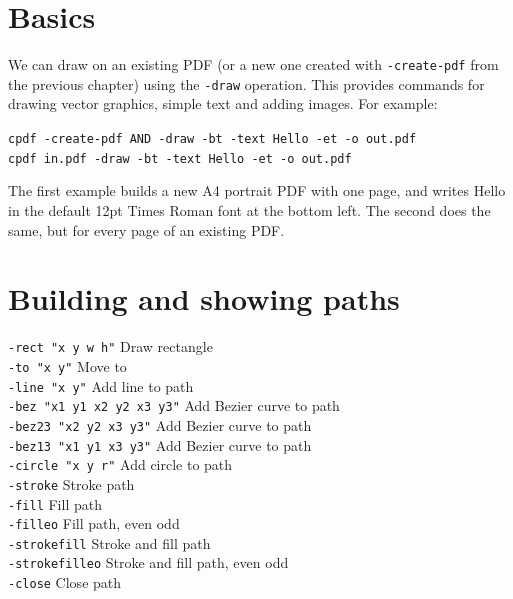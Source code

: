 \documentclass{book}
\begin{document}
\section{Basics}

We can draw on an existing PDF (or a new one created with \texttt{-create-pdf} from the previous chapter) using the \texttt{-draw} operation. This provides commands for drawing vector graphics, simple text and adding images. For example:

\begin{framed}
 \noindent\small\verb?cpdf -create-pdf AND -draw -bt -text Hello -et -o out.pdf?\\
 \noindent\small\verb?cpdf in.pdf -draw -bt -text Hello -et -o out.pdf?
\end{framed}

\noindent The first example builds a new A4 portrait PDF with one page, and writes Hello in the default 12pt Times Roman font at the bottom left. The second does the same, but for every page of an existing PDF.

\section{Building and showing paths}

  {\small\begin{framed}
   \noindent\verb!-rect "x y w h"! Draw rectangle\\
   \noindent\verb!-to "x y"! Move to\\
   \noindent\verb!-line "x y"! Add line to path\\
   \noindent\verb!-bez "x1 y1 x2 y2 x3 y3"! Add Bezier curve to path\\
   \noindent\verb!-bez23 "x2 y2 x3 y3"! Add Bezier curve to path\\
   \noindent\verb!-bez13 "x1 y1 x3 y3"! Add Bezier curve to path\\
   \noindent\verb!-circle "x y r"! Add circle to path\\
   \noindent\verb!-stroke! Stroke path\\
   \noindent\verb!-fill! Fill path\\
   \noindent\verb!-filleo! Fill path, even odd\\
   \noindent\verb!-strokefill! Stroke and fill path\\
   \noindent\verb!-strokefilleo! Stroke and fill path, even odd\\
   \noindent\verb!-close! Close path
  \end{framed}}
\end{document}
